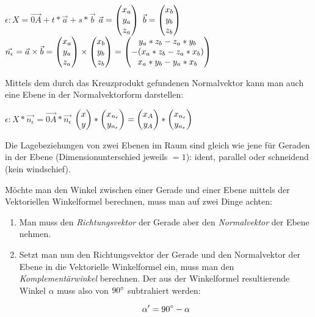 \begin{center}
  $\epsilon: X = \vec{0A} + t * \vec{a} + s * \vec{b}$
  \extrapar
  $ \vec{a} = \begin{pmatrix}x_{a}\\y_{a}\\z_{a}\end{pmatrix}$
  \extrapar
  $ \vec{b} = \begin{pmatrix}x_{b}\\y_{b}\\z_{b}\end{pmatrix}$
  \extrapar
  $ \vec{n_{\epsilon}} 
    = \vec{a} \times \vec{b} 
    = \begin{pmatrix}x_{a}\\y_{a}\\z_{a}\end{pmatrix} \times \begin{pmatrix}x_{b}\\y_{b}\\z_{b}\end{pmatrix} 
    = \begin{pmatrix}y_{a} * z_{b} - z_{a} * y_{b}\\ - (x_{a} * z_{b} - z_{a} * x_{b})\\x_{a} * y_{b} - y_{a} * x_{b}\end{pmatrix}$  
\end{center}

\pagebreak


Mittels dem durch das Kreuzprodukt gefundenen Normalvektor kann man auch eine Ebene in der Normalvektorform darstellen:

\begin{center} 
  $\epsilon: X * \vec{n_{\epsilon}} = \vec{0A} * \vec{n_{\epsilon}}$
  \extrapar
  $\begin{pmatrix}x\\y\end{pmatrix} * \begin{pmatrix}x_{n_{\epsilon}}\\y_{n_{\epsilon}}\end{pmatrix} = \begin{pmatrix}x_{A} \\ y_{A}\end{pmatrix} * \begin{pmatrix}x_{n_{\epsilon}}\\y_{n_{\epsilon}}\end{pmatrix}$
\end{center}


Die Lagebeziehungen von zwei Ebenen im Raum sind gleich wie jene f\"{u}r Geraden in der Ebene (Dimensionunterschied jeweils $= 1$): ident, parallel oder schneidend (kein windschief).


M\"{o}chte man den Winkel zwischen einer Gerade und einer Ebene mittels der Vektoriellen Winkelformel berechnen, muss man auf zwei Dinge achten:

\begin{enumerate}
  \item Man muss den \emph{Richtungsvektor} der Gerade aber den \emph{Normalvektor} der Ebene nehmen.
  \item Setzt man nun den Richtungsvektor der Gerade und den Normalvektor der Ebene in die Vektorielle Winkelformel ein, muss man den \emph{Komplement\"{a}rwinkel} berechnen. Der aus der Winkelformel resultierende Winkel $\alpha$ muss also von $90\degree$ subtrahiert werden:

   $$\alpha' = 90\degree - \alpha$$
   
\end{enumerate}


